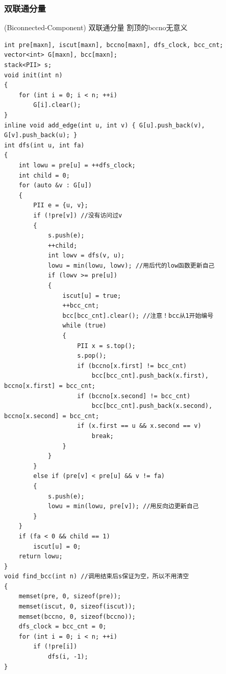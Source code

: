 \documentclass[twoside]{article}
\begin{document}
\subsubsection{双联通分量}
(Biconnected-Component) 双联通分量
割顶的bccno无意义
\begin{lstlisting}
int pre[maxn], iscut[maxn], bccno[maxn], dfs_clock, bcc_cnt;
vector<int> G[maxn], bcc[maxn];
stack<PII> s;
void init(int n)
{
    for (int i = 0; i < n; ++i)
        G[i].clear();
}
inline void add_edge(int u, int v) { G[u].push_back(v), G[v].push_back(u); }
int dfs(int u, int fa)
{
    int lowu = pre[u] = ++dfs_clock;
    int child = 0;
    for (auto &v : G[u])
    {
        PII e = {u, v};
        if (!pre[v]) //没有访问过v
        {
            s.push(e);
            ++child;
            int lowv = dfs(v, u);
            lowu = min(lowu, lowv); //用后代的low函数更新自己
            if (lowv >= pre[u])
            {
                iscut[u] = true;
                ++bcc_cnt;
                bcc[bcc_cnt].clear(); //注意！bcc从1开始编号
                while (true)
                {
                    PII x = s.top();
                    s.pop();
                    if (bccno[x.first] != bcc_cnt)
                        bcc[bcc_cnt].push_back(x.first), bccno[x.first] = bcc_cnt;
                    if (bccno[x.second] != bcc_cnt)
                        bcc[bcc_cnt].push_back(x.second), bccno[x.second] = bcc_cnt;
                    if (x.first == u && x.second == v)
                        break;
                }
            }
        }
        else if (pre[v] < pre[u] && v != fa)
        {
            s.push(e);
            lowu = min(lowu, pre[v]); //用反向边更新自己
        }
    }
    if (fa < 0 && child == 1)
        iscut[u] = 0;
    return lowu;
}
void find_bcc(int n) //调用结束后s保证为空，所以不用清空
{
    memset(pre, 0, sizeof(pre));
    memset(iscut, 0, sizeof(iscut));
    memset(bccno, 0, sizeof(bccno));
    dfs_clock = bcc_cnt = 0;
    for (int i = 0; i < n; ++i)
        if (!pre[i])
            dfs(i, -1);
}
\end{lstlisting}
\end{document}
